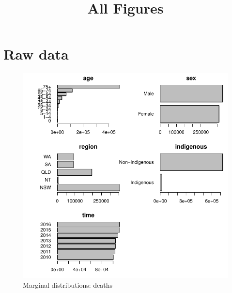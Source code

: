 \documentclass{article}
\begin{document}
\title{All Figures}

\maketitle

\newpage

\section{Raw data}
\newpage

\begin{figure}
  \centering
  \includegraphics{out/fig_data_deaths}
  \caption{Marginal distributions: deaths}
\end{figure}
\newpage
\end{document}
